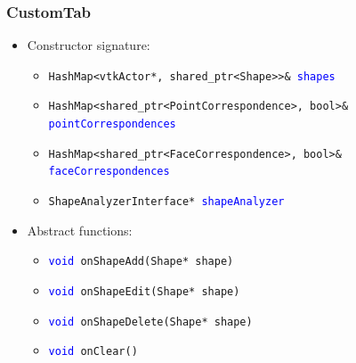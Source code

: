\documentclass[compress]{beamer}
\begin{document}
\begin{frame}
	\frametitle{CustomTab}
	
	\begin{itemize}
		\item Constructor signature:
		\begin{itemize}
			\item \texttt{HashMap<vtkActor*, shared\_ptr<Shape>>\& \textcolor{blue}{shapes}}
			\item \texttt{HashMap<shared\_ptr<PointCorrespondence>, bool>\& \textcolor{blue}{pointCorrespondences}}
			\item \texttt{HashMap<shared\_ptr<FaceCorrespondence>, bool>\& \textcolor{blue}{faceCorrespondences}}
			\item \texttt{ShapeAnalyzerInterface* \textcolor{blue}{shapeAnalyzer}}
		\end{itemize}
		\item Abstract functions:
		\begin{itemize}
			\item \texttt{\textcolor{blue}{void} onShapeAdd(Shape* shape)}
			\item \texttt{\textcolor{blue}{void} onShapeEdit(Shape* shape)}
			\item \texttt{\textcolor{blue}{void} onShapeDelete(Shape* shape)}
			\item \texttt{\textcolor{blue}{void} onClear()}
		\end{itemize}
	\end{itemize}
\end{frame}
\end{document}
